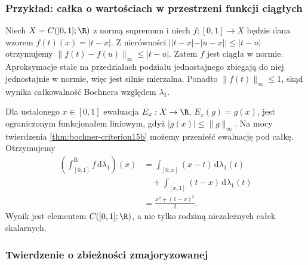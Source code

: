 \subsubsection{Przykład: całka o wartościach w przestrzeni funkcji ciągłych}

\begin{przyklad}
\label{ex:bochner-continuous-functions15b}
Niech $X=C([0,1];\R)$ z normą supremum i niech
$f:[0,1]\to X$ będzie dana wzorem
$f(t)(x)=|t-x|$. Z nierówności
$||t-x|-|u-x||\le|t-u|$ otrzymujemy
$\|f(t)-f(u)\|_\infty\le|t-u|$.
Zatem $f$ jest ciągła w normie. Aproksymacje stałe
na przedziałach podziału jednostajnego zbiegają do niej
jednostajnie w normie, więc jest silnie mierzalna.
Ponadto $\|f(t)\|_\infty\le1$, skąd wynika całkowalność
Bochnera względem $\lambda_1$.

Dla ustalonego $x\in[0,1]$ ewaluacja
$E_x:X\to\R$, $E_x(g)=g(x)$, jest ograniczonym
funkcjonałem liniowym, gdyż $|g(x)|\le\|g\|_\infty$.
Na mocy twierdzenia \ref{thm:bochner-criterion15b}
możemy przenieść ewaluację pod całkę. Otrzymujemy
\[
 \begin{aligned}
 \left(\int_{[0,1]}^{\mathrm B}f\,\mathrm d\lambda_1\right)(x)
 &=\int_{[0,x]}(x-t)\,\mathrm d\lambda_1(t)\\
 &\quad+\int_{[x,1]}(t-x)\,\mathrm d\lambda_1(t)\\
 &=\frac{x^2+(1-x)^2}{2}.
 \end{aligned}
\]
Wynik jest elementem $C([0,1];\R)$, a nie tylko
rodziną niezależnych całek skalarnych.
\end{przyklad}

\subsubsection{Twierdzenie o zbieżności zmajoryzowanej}

